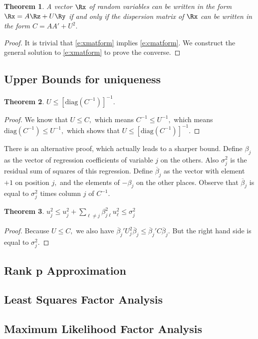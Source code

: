 \documentclass[12pt]{amsart}
\newtheorem{theorem}{Theorem}[section]
\theoremstyle{definition}
\theoremstyle{remark}
\numberwithin{equation}{section}
\begin{document}
%
\begin{theorem}\label{t:funda}
A vector $\Rx$ of random variables can be written in the
form $\Rx=A\Rz+U\Ry$ if and only if the dispersion matrix
of $\Rx$ can be written in the form
$C=AA'+U^2.$
\end{theorem}
%
\begin{proof}
It is trivial that \ref{e:xmatform} implies \ref{e:cmatform}. We
construct the general solution to \ref{e:xmatform} to prove the
converse.
\end{proof}
%
\subsection{Upper Bounds for uniqueness}
\begin{theorem}\label{t:bound1}
$U\leq[\mathrm{diag}(C^{-1})]^{-1}.$
\end{theorem}
%
\begin{proof}
We know that $U\leq C,$ which means $C^{-1}\leq U^{-1},$ which
means $\mathrm{diag}(C^{-1})\leq U^{-1},$ which shows that
$U\leq[\mathrm{diag}(C^{-1})]^{-1}.$
\end{proof}
%
There is an alternative proof, which actually leads to a
sharper bound. Define $\beta_j$ as the vector of
regression coefficients of variable $j$ on the others.
Also $\sigma_j^2$
is the residual sum of squares of this regression.
Define $\overline\beta_j$ as the vector with element
$+1$ on position $j,$ and the elements of $-\beta_j$
on the other places. Observe that $\overline\beta_j$ is
equal to $\sigma_j^2$ times column $j$ of $C^{-1}.$ 
%
\begin{theorem}\label{t:bound2}
$u_j^2\leq u_j^2+\sum_{\ell\not= j}\beta_{j\ell}^2 u_\ell^2\leq\sigma_j^2$
\end{theorem}
%
\begin{proof}
Because $U\leq C,$ we also have $\overline\beta_j'U_j^2\overline\beta_j\leq
\overline\beta_j'C\overline\beta_j.$ But the right hand side is equal to
$\sigma_j^2.$
\end{proof}
%
\subsection{Rank p Approximation}
\subsection{Least Squares Factor Analysis}
\subsection{Maximum Likelihood Factor Analysis}
\end{document}

